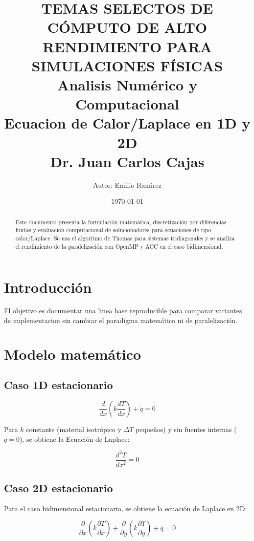 \documentclass[11pt,a4paper]{article}
\title{TEMAS SELECTOS DE C\'OMPUTO DE ALTO RENDIMIENTO PARA SIMULACIONES F\'ISICAS\\
Analisis Num\'erico y Computacional\\
Ecuacion de Calor/Laplace en 1D y 2D\\
Dr. Juan Carlos Cajas}
\author{Autor: Emilio Ramirez}
\date{\today}
\begin{document}
\maketitle

\begin{abstract}
Este documento presenta la formulaci\'on matem\'atica, discretizaci\'on por diferencias
finitas y evaluacion computacional de solucionadores para ecuaciones de tipo
calor/Laplace. Se usa el algoritmo de Thomas para sistemas tridiagonales y se
analiza el rendimiento de la paralelizaci\'on con OpenMP y ACC en el caso bidimensional.
\end{abstract}

\section{Introducci\'on}
El objetivo es documentar una linea base reproducible para comparar variantes de
implementacion sin cambiar el paradigma matem\'atico ni de paralelizaci\'on.

\section{Modelo matem\'atico}
\subsection{Caso 1D estacionario}
\begin{equation}
\frac{d}{dx}\left(k\frac{dT}{dx}\right) + \dot{q} = 0
\end{equation}

Para $k$ constante (material isotr\'opico y $\Delta T$ peque\~nos) 
y sin fuentes internas ($\dot{q}=0$), se obtiene la Ecuaci\'on de Laplace:

\begin{equation}
\frac{d^2T}{dx^2}=0
\end{equation}

\subsection{Caso 2D estacionario}

Para el caso bidimensional estacionario, se obtiene la ecuaci\'on de Laplace en 2D:

\begin{equation}
\frac{\partial}{\partial x}\left(k\frac{\partial T}{\partial x}\right) + \frac{\partial}{\partial y}\left(k\frac{\partial T}{\partial y}\right) + \dot{q} = 0
\end{equation}
\end{document}
